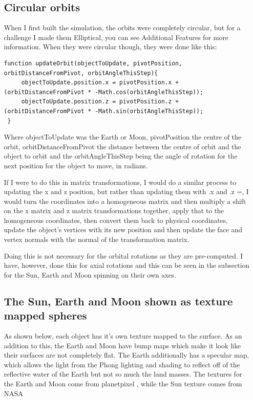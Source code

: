 \documentclass[12pt]{article}
\begin{document}
\subsection{Circular orbits}
When I first built the simulation, the orbits were completely circular, but for a challenge I made them Elliptical, you can see Additional Features for more information. When they were circular though, they were done like this: 

\begin{lstlisting}
function updateOrbit(objectToUpdate, pivotPosition, orbitDistanceFromPivot, orbitAngleThisStep){
     objectToUpdate.position.x = pivotPosition.x + (orbitDistanceFromPivot * -Math.cos(orbitAngleThisStep));
     objectToUpdate.position.z = pivotPosition.z + (orbitDistanceFromPivot * -Math.sin(orbitAngleThisStep));
 }
 \end{lstlisting}
Where objectToUpdate was the Earth or Moon, pivotPosition the centre of the orbit, orbitDistanceFromPivot the distance between the centre of orbit and the object to orbit and the orbitAngleThisStep being the angle of rotation for the next position for the object to move, in radians.
 
If I were to do this in matrix transformations, I would do a similar process to updating the x and z position, but rather than updating them with .x and .z =, I would turn the coordinates into a homogeneous matrix and then multiply a shift on the x matrix and z matrix transformations together, apply that to the homogeneous coordinates, then convert them back to physical coordinates, update the object's vertices with its new position and then update the face and vertex normals with the normal of the transformation matrix. 
 
Doing this is not necessary for the orbital rotations as they are pre-computed. I have, however, done this for axial rotations and this can be seen in the subsection for the Sun, Earth and Moon spinning on their own axes.

\subsection{The Sun, Earth and Moon shown as texture mapped spheres}
As shown below, each object has it's own texture mapped to the surface. As an addition to this, the Earth and Moon have bump maps which make it look like their surfaces are not completely flat. The Earth additionally has a specular map, which allows the light from the Phong lighting and shading to reflect off of the reflective water of the Earth but not so much the land masses. The textures for the Earth and Moon come from planetpixel \cite{earthtextures}, while the Sun texture comes from NASA\cite{suntexture}
\end{document}
